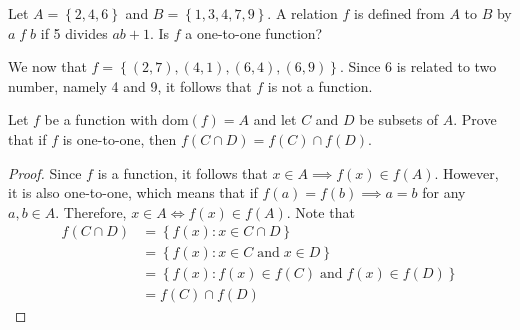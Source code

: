 \documentclass[12pt]{article}
\newcommand{\Dom}[1]{\mathrm{dom}(#1)}
\newenvironment{problem}[2][Problem]{\begin{trivlist} \item[\hskip \labelsep {\bfseries #1}\hskip \labelsep {\bfseries #2.}]}{\end{trivlist}}
\newenvironment{solution}[1][Solution]{\begin{trivlist} \item[\hskip \labelsep {\bfseries #1}]}{\end{trivlist}}
\begin{document}
    \begin{problem}{28}
      Let $A=\left\{ 2,4,6 \right\}$ and $B=\left\{ 1,3,4,7,9 \right\}$. A relation $f$ is defined from $A$ to $B$ by $a\; f \;b$ if 5 divides $ab+1$. Is $f$ a one-to-one function?
    \begin{solution}
      We now that $f=\left\{ (2,7),(4,1),(6,4),(6,9) \right\}$. Since $6$ is related to two number, namely 4 and 9, it follows that $f$ is not a function.
    \end{solution}
    \end{problem}
    \begin{problem}{29}
      Let $f$ be a function with $\Dom{f}= A$ and let $C$ and $D$ be subsets of $A$. Prove that if $f$ is one-to-one, then $f(C\cap D) = f(C)\cap f(D)$.
    \begin{proof}
      Since $f$ is a function, it follows that $x\in A \implies f(x) \in f(A)$. However, it is also one-to-one, which means that if $f(a)=f(b)\implies a=b$ for any $a,b\in A$. Therefore, $x\in A \iff f(x) \in f(A)$. Note that 
    \begin{align*}
      f(C\cap D) &= \left\{ f(x):x\in C\cap D \right\}\\
      &= \left\{ f(x): x\in C \; \mathrm{and} \; x\in D\right\}\\
      &= \left\{ f(x): f(x)\in f(C) \; \mathrm{and} \; f(x)\in f(D) \right\}\\
      &= f(C)\cap f(D)
    \end{align*}
    \end{proof}
    \end{problem}
\end{document}
